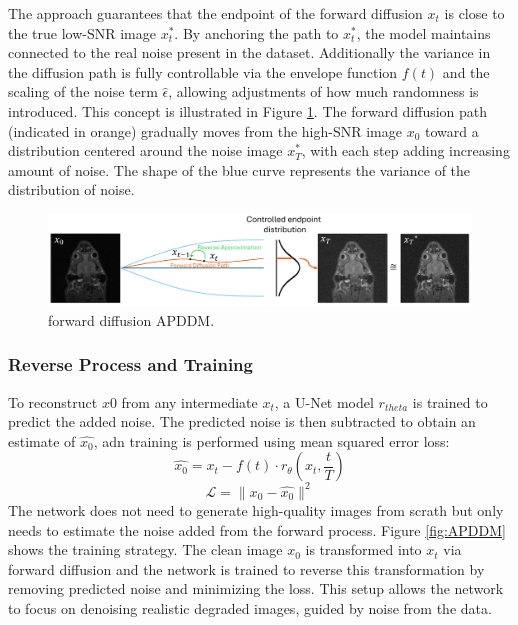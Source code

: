 \documentclass[twocolumn]{article}
\begin{document}
The approach guarantees that the endpoint of the forward diffusion $x_t$ is close to the true low-SNR image $x_t^*$. 
By anchoring the path to $x_t^*$, the model maintains connected to the real noise present in the dataset. 
Additionally the variance in the diffusion path is fully controllable via the envelope function $f(t)$ and the scaling of the noise term $\hat{\epsilon} $, allowing adjustments of how much randomness is introduced. 
This concept is illustrated in Figure \ref{fig:forward APDDM}. The forward diffusion path (indicated in orange) gradually moves from the high-SNR image $x_0$ toward a distribution centered around the noise image $x_T^*$, with each step adding increasing amount of noise. 
The shape of the blue curve represents the variance of the distribution of noise.

\begin{figure}[H]
    \centering
    \includegraphics[width=1\linewidth]{forward APDDM.png}
    \caption{forward diffusion APDDM.}
    \label{fig:forward APDDM}
\end{figure}


\subsubsection{Reverse Process and Training}
To reconstruct $x0$ from any intermediate $x_t$, a U-Net model $r_{theta}$ is trained to predict the added noise. 
The predicted noise is then subtracted to obtain an estimate of $\hat{x_0}$, adn training is performed using mean squared error loss: 
\begin{equation}\label{eq:Markov chain}
    \hat{x_0}=x_t-f(t) \cdot r_{\theta}(x_t,\frac{t}{T})
\end{equation}
\begin{equation}
    \mathcal{L}=\|x_0-\hat{x_0}\|^2
\end{equation}
The network does not need to generate high-quality images from scrath but only needs to estimate the noise added from the forward process. 
Figure \ref{fig:APDDM} shows the training strategy. The clean image $x_0$ is transformed into $x_t$ via forward diffusion and the network is trained to reverse this transformation by removing predicted noise and minimizing the loss. 
This setup allows the network to focus on denoising realistic degraded images, guided by noise from the data.
\end{document}
